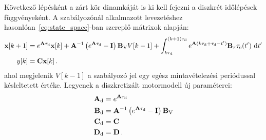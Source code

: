 Következő lépésként a zárt kör dinamkáját is ki kell fejezni a diszkrét időlépések függvényeként. 
A szabályozónál alkalmazott levezetéshez hasonlóan~\eqref{eq:state_space}-ban szereplő mátrixok alapján:
\begin{align}\label{eq:discrete_motor_state}
    \begin{split}    
        \mathbf{x}[k+1] &= e^{\mathbf{A} \tau_{\mathrm{d}}}\mathbf{x}[k] + 
        \mathbf{A}^{-1}\left(e^{\mathbf{A} \tau_{\mathrm{d}}} - \mathbf{I}\right)\mathbf{B}_{\mathrm{V}} V[k-1] + 
        \int_{k\tau_{\mathrm{d}}}^{(k+1)\tau_{\mathrm{d}}} e^{\mathbf{A} (k\tau_{\mathrm{d}} + \tau_{\mathrm{d}}-t')}\mathbf{B}_{\mathrm{\tau}} \tau_{\mathrm{e}}(t')~\mathrm{d}t'\\
        y[k] &= \mathbf{C} \mathbf{x}[k]\,.
    \end{split}        
\end{align}
ahol megjelenik \(V[k-1]\) a szabályozó jel egy egész mintavételezési periódussal késleltetett értéke. 
Legyenek a diszkretizált motormodell új paraméterei:
\begin{align}\label{eq:discrete_motor_matrices}
    \begin{split}
        \mathbf{A}_{\mathrm{d}} &= e^{\mathbf{A}\tau_{\mathrm{d}}} \\
        \mathbf{B}_{\mathrm{d}} &= \mathbf{A}^{-1}\left(e^{\mathbf{A}\tau_{\mathrm{d}}}-\mathbf{I}\right)\mathbf{B}_{\mathrm{V}} \\
        \mathbf{C}_{\mathrm{d}} &= \mathbf{C} \\
        \mathbf{D}_{\mathrm{d}} &= \mathbf{D} \,.
    \end{split}        
\end{align}

